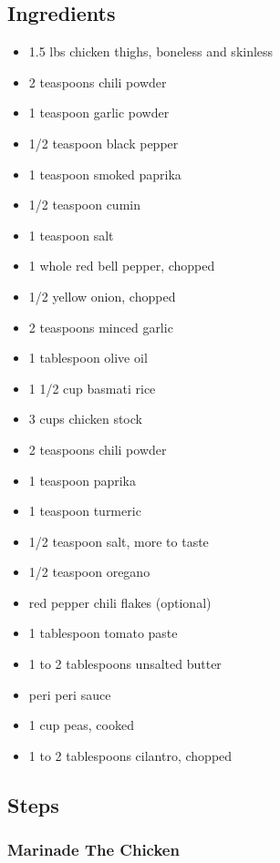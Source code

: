 \documentclass[]{article}
\providecommand{\tightlist}{%
  \setlength{\itemsep}{0pt}\setlength{\parskip}{0pt}}
\begin{document}
\hypertarget{ingredients}{%
\subsection{Ingredients}\label{ingredients}}

\begin{itemize}
\tightlist
\item
  1.5 lbs chicken thighs, boneless and skinless
\item
  2 teaspoons chili powder
\item
  1 teaspoon garlic powder
\item
  1/2 teaspoon black pepper
\item
  1 teaspoon smoked paprika
\item
  1/2 teaspoon cumin
\item
  1 teaspoon salt
\item
  1 whole red bell pepper, chopped
\item
  1/2 yellow onion, chopped
\item
  2 teaspoons minced garlic
\item
  1 tablespoon olive oil
\item
  1 1/2 cup basmati rice
\item
  3 cups chicken stock
\item
  2 teaspoons chili powder
\item
  1 teaspoon paprika
\item
  1 teaspoon turmeric
\item
  1/2 teaspoon salt, more to taste
\item
  1/2 teaspoon oregano
\item
  red pepper chili flakes (optional)
\item
  1 tablespoon tomato paste
\item
  1 to 2 tablespoons unsalted butter
\item
  peri peri sauce
\item
  1 cup peas, cooked
\item
  1 to 2 tablespoons cilantro, chopped
\end{itemize}

\hypertarget{steps}{%
\subsection{Steps}\label{steps}}

\hypertarget{marinade-the-chicken}{%
\subsubsection{Marinade The Chicken}\label{marinade-the-chicken}}
\end{document}
